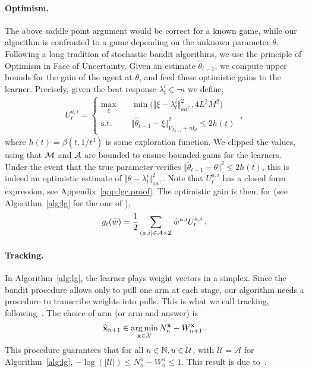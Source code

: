 \paragraph{Optimism.} The above saddle point argument would be correct for a known game, while our algorithm is confronted to a game depending on the unknown parameter $\theta$. Following a long tradition of stochastic bandit algorithms, we use the principle of Optimism in Face of Uncertainty. Given an estimate $\hat{\theta}_{t-1}$, we compute upper bounds for the gain of the agent at $\theta$, and feed these optimistic gains to the learner. Precisely, given the best response $\lambda_t^i \in \neg i$ we define,
\begin{align*}
U_t^{a,i} =\left\{
\begin{array}{ll}
\max_{\xi} \quad & \min\big(\Vert \xi - \lambda_t^i \Vert^2_{a a^\top},4L^2M^2\big)\\
\text{s.t.}\quad & \Vert \hat{\theta}_{t-1} - \xi \Vert^2_{V_{N_{t-1}}+\eta I_d} \le 2h(t)
\end{array}
\right. \: ,
\end{align*}
where $h(t)=\beta(t, 1/t^3)$ is some exploration function. We clipped the values, using that $\mathcal{M}$ and $\mathcal{A}$ are bounded to ensure bounded gains for the learners. Under the event that the true parameter verifies $\Vert \hat{\theta}_{t-1} - \theta \Vert^2 \le 2 h(t)$, this is indeed an optimistic estimate of $\Vert \theta - \lambda_t^i \Vert^2_{a a^\top}$. Note that $U_t^{a,i}$ has a closed form expression, see Appendix~\ref{app:lgc.proof}. The optimistic gain is then, for \LGC (see Algorithm~\ref{alg:lg} for the one of \LG),
\[
g_t(\widetilde{w}) = \frac{1}{2} \sum_{(a,i)\in\mathcal{A}\times\mathcal{I}}  \widetilde{w}^{a,i} U_t^{a,i}\,.
\]


\paragraph{Tracking.} In Algorithm~\ref{alg:lg}, the learner plays weight vectors in a simplex. Since the bandit procedure allows only to pull one arm at each stage, our algorithm needs a procedure to transcribe weights into pulls. This is what we call tracking, following~\citet{garivier2016tracknstop}. The choice of arm (or arm and answer) is
\begin{align*}
    \widehat{{\bf x}}_{n+1} \in \operatorname*{arg\,min}_{{\bf x}\in \mathcal{X} } N_{n}^{{\bf x}} - W_{n+1}^{{\bf x}}\,.
\end{align*}
This procedure guarantees that for all $n\in{\mathbb N}, u \in \mathcal U$, with $\mathcal U = \mathcal A$ for Algorithm~\ref{alg:lg}, $- \log (|\mathcal U|) \le N_n^{u} - W_n^{u} \le 1$. This result is due to~\citet{degenne2020structure}.

